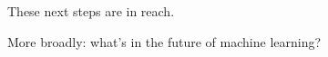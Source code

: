 \documentclass{beamer}
\newcommand\Wider[2][3em]{%
\makebox[\linewidth][c]{%
  \begin{minipage}{\dimexpr\textwidth+#1\relax}
  \raggedright#2
  \end{minipage}%
  }%
}
\begin{document}


\begin{frame}{}

  These next steps are in reach.

  \vspace{1cm}

  More broadly: what's in the future of machine learning?

\end{frame}
\end{document}

